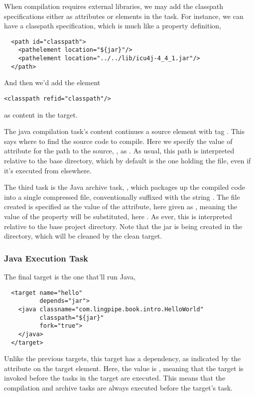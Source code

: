 When compilation requires external libraries, we may add the classpath
specifications either as attributes or elements in the 
task.  For instance, we can have a classpath specification, which
is much like a property definition,

\begin{verbatim}
  <path id="classpath">
    <pathelement location="${jar}"/>
    <pathelement location="../../lib/icu4j-4_4_1.jar"/>
  </path>
\end{verbatim}
%
And then we'd add the element 
%
\begin{verbatim}
<classpath refid="classpath"/>
\end{verbatim}
%
as content in the  target.

The java compilation task's content continues a source element with
tag .  This says where to find the source code to compile.
Here we specify the value of attribute for the path to the source,
, as .  As usual, this path is interpreted
relative to the base directory, which by default is the one holding
the  file, even if it's executed from elsewhere.

The third task is the Java archive task, , which packages up
the compiled code into a single compressed file, conventionally
suffixed with the string .  The file created is specified
as the value of the  attribute, here given as
, meaning the value of the  property will be
substituted, here .  As ever, this is
interpreted relative to the base project directory.  Note that the jar
is being created in the  directory, which will be cleaned
by the clean target.  

\subsubsection{Java Execution Task}

The final target is the one that'll run Java,

\begin{verbatim}
  <target name="hello"
          depends="jar">
    <java classname="com.lingpipe.book.intro.HelloWorld"
          classpath="${jar}"
          fork="true">
    </java>
  </target>
\end{verbatim}
%
Unlike the previous targets, this target has a dependency, as
indicated by the  attribute on the target element.
Here, the value is , meaning that the  target is
invoked before the tasks in the  target are executed.
This means that the compilation and archive tasks are always executed
before the  target's task.  

